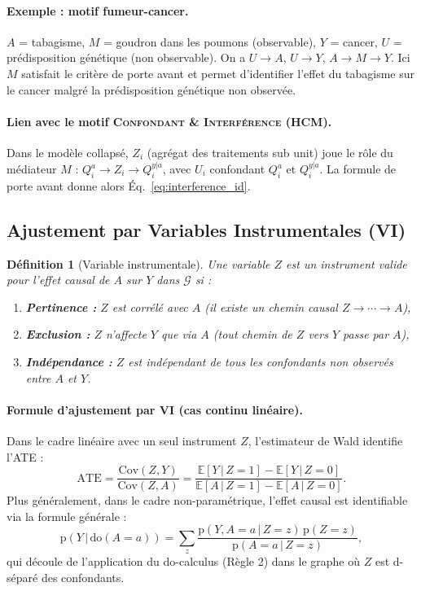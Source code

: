 \documentclass[11pt,a4paper]{article}
\newcommand{\E}[1]{\mathbb{E}\left[ #1 \right]}
\newcommand{\rmdo}{\mathrm{do}}
\newcommand{\g}{\,\vert\,}
\newcommand{\pr}{\mathrm{p}}
\newtheorem{definition}{Définition}
\begin{document}
\paragraph{Exemple : motif fumeur-cancer.}
$A$ = tabagisme, $M$ = goudron dans les poumons (observable), $Y$ = cancer, $U$ = prédisposition génétique (non observable).
On a $U \to A$, $U \to Y$, $A \to M \to Y$.
Ici $M$ satisfait le critère de porte avant et permet d'identifier l'effet du tabagisme sur le cancer malgré la prédisposition génétique non observée.

\paragraph{Lien avec le motif \textsc{Confondant \& Interférence} (HCM).}
Dans le modèle collapsé, $Z_i$ (agrégat des traitements sub unit) joue le rôle du médiateur $M$ : $Q^a_i \to Z_i \to Q^{y|a}_i$, avec $U_i$ confondant $Q^a_i$ et $Q^{y|a}_i$.
La formule de porte avant donne alors Éq.~\eqref{eq:interference_id}.

\subsection{Ajustement par Variables Instrumentales (VI)}

\begin{definition}[Variable instrumentale]
Une variable $Z$ est un \emph{instrument valide} pour l'effet causal de $A$ sur $Y$ dans $\mathcal{G}$ si :
\begin{enumerate}[label=(\roman*)]
  \item \textbf{Pertinence :} $Z$ est corrélé avec $A$ (il existe un chemin causal $Z \to \cdots \to A$),
  \item \textbf{Exclusion :} $Z$ n'affecte $Y$ que via $A$ (tout chemin de $Z$ vers $Y$ passe par $A$),
  \item \textbf{Indépendance :} $Z$ est indépendant de tous les confondants non observés entre $A$ et $Y$.
\end{enumerate}
\end{definition}

\paragraph{Formule d'ajustement par VI (cas continu linéaire).}
Dans le cadre linéaire avec un seul instrument $Z$, l'estimateur de Wald identifie l'ATE :
\begin{equation}
  \text{ATE} = \frac{\mathrm{Cov}(Z, Y)}{\mathrm{Cov}(Z, A)} = \frac{\E{Y \g Z=1} - \E{Y \g Z=0}}{\E{A \g Z=1} - \E{A \g Z=0}}.
  \label{eq:iv_wald}
\end{equation}
Plus généralement, dans le cadre non-paramétrique, l'effet causal est identifiable via la formule générale :
\begin{equation}
  \pr(Y \g \rmdo(A=a)) = \sum_{z} \frac{\pr(Y, A=a \g Z=z)\, \pr(Z=z)}{\pr(A=a \g Z=z)},
  \label{eq:iv_general}
\end{equation}
qui découle de l'application du do-calculus (Règle 2) dans le graphe où $Z$ est d-séparé des confondants.
\end{document}
